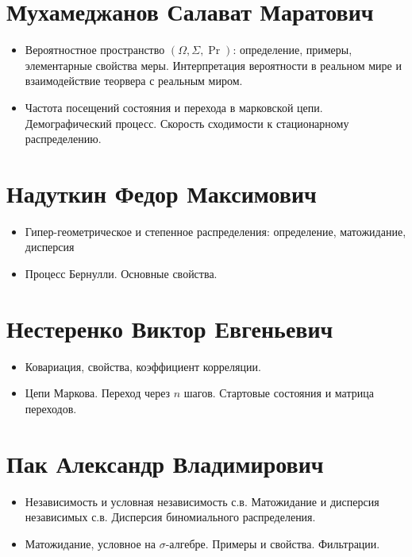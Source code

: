 \documentclass[12pt]{article}
\begin{document}
\section{Мухамеджанов Салават Маратович}

\begin{itemize}
  \item Вероятностное пространство $(\Omega, \Sigma, \Pr)$: определение, примеры, элементарные свойства меры. Интерпретация вероятности в реальном мире и взаимодействие теорвера с реальным миром.
  \item Частота посещений состояния и перехода в марковской цепи. Демографический процесс. Скорость сходимости к стационарному распределению.
\end{itemize}

\section{Надуткин Федор Максимович}

\begin{itemize}
  \item Гипер-геометрическое и степенное распределения: определение, матожидание, дисперсия
  \item Процесс Бернулли. Основные свойства.
\end{itemize}

\section{Нестеренко Виктор Евгеньевич}

\begin{itemize}
  \item Ковариация, свойства, коэффициент корреляции.
  \item Цепи Маркова. Переход через $n$ шагов. Стартовые состояния и матрица переходов.
\end{itemize}

\section{Пак Александр Владимирович}

\begin{itemize}
  \item Независимость и условная независимость с.в. Матожидание и дисперсия независимых с.в. Дисперсия биномиального распределения.
  \item Матожидание, условное на $\sigma$-алгебре. Примеры и свойства. Фильтрации.
\end{itemize}
\end{document}
